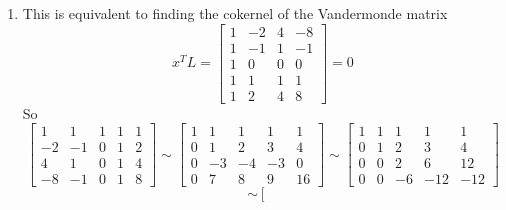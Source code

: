 \documentclass{article}
\begin{document}
\begin{enumerate}
\[\begin{array}{rrrrrr}
    \end{array}
    \right]\sim
    \left[
    \begin{array}{rrrrrr}
    1 & -1 & 1 & 1 \\
    0 & 1  & -1 & -1 & 1 \\
    0 & 0 & 1 & 0.5 & -1 & 0.5
    \end{array}
    \right]\sim\left[
    \begin{array}{rrrrrr}
    1 & 0 & 0 & 0 & 1 & 0 \\
    0 & 1 & 0 & -0.5 & 0 & 0.5 \\
    0 & 0 & 1 & 0.5 & -1 & 0.5
    \end{array}
    \right]
    \]
    Therefore,
    \[p_{-1}(x) = -\frac{1}{2}x+\frac{1}{2}x ^ 2, p_0(x) = 1 -x ^ 2, p_1(x) = \frac{1}{2}x+\frac{1}{2}x ^ 2\]
    \item 
    This is equivalent to finding the cokernel of the Vandermonde matrix
    \[ x^TL = \left[
    \begin{array}{llll}
    1 & -2 & 4 & -8 \\
    1 & -1 & 1 & -1 \\
    1 &  0 & 0 &  0 \\
    1 &  1 & 1 &  1 \\
    1 &  2 & 4 &  8 
    \end{array}
    \right] = 0\]
    So
    \[
    \left[
    \begin{array}{lllll}
     1 &  1 & 1 & 1 & 1 \\
    -2 & -1 & 0 & 1 & 2 \\
     4 &  1 & 0 & 1 & 4 \\
    -8 & -1 & 0 & 1 & 8
    \end{array}
    \right]\sim
    \left[
    \begin{array}{lllll}
     1 &  1 & 1 & 1 & 1 \\
     0 &  1 & 2 & 3 & 4 \\
     0 & -3 &-4 &-3 & 0 \\
     0 &  7 & 8 & 9 & 16
    \end{array}
    \right]\sim
    \left[
    \begin{array}{lllll}
     1 &  1 & 1 & 1 & 1 \\
     0 &  1 & 2 & 3 & 4 \\
     0 &  0 & 2 & 6 &12 \\
     0 &  0 &-6 &-12&-12
    \end{array}
    \right]\]
    \[\sim
    \left[
    \begin{array}{lllll}

\end{array}\]
\end{enumerate}
\end{document}
